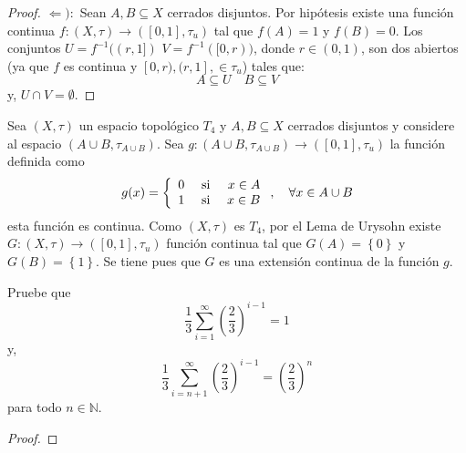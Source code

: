 \documentclass[12pt]{report}
\theoremstyle{largebreak}
\newcommand\cf[3]{\ensuremath{#1:#2\rightarrow#3}}
\begin{document}
\begin{proof}
        $\Leftarrow):$ Sean $A,B\subseteq X$ cerrados disjuntos. Por hipótesis existe una función continua $\cf{f}{(X,\tau)}{([0,1],\tau_u)}$ tal que $f(A)=1$ y $f(B)=0$. Los conjuntos $U=f^{-1}((r,1])$ $V=f^{-1}([0,r))$, donde $r\in(0,1)$, son dos abiertos (ya que $f$ es continua y $[0,r),(r,1],\in\tau_u$) tales que:
        \begin{equation*}
            A\subseteq U\quad B\subseteq V
        \end{equation*}
        y, $U\cap V=\emptyset$.
    \end{proof}

    \begin{exa}
        Sea $(X,\tau)$ un espacio topológico $T_4$ y $A,B\subseteq X$ cerrados disjuntos y considere al espacio $(A\cup B,\tau_{A\cup B})$. Sea $\cf{g}{(A\cup B,\tau_{A\cup B})}{([0,1],\tau_u)}$ la función definida como
        \begin{equation*}
            g(x)=\left\{ 
                \begin{array}{lcr}
                    0 &\textup{ si } & x\in A\\
                    1 &\textup{ si } & x\in B\\
                \end{array}
            \right.,\quad\forall x\in A\cup B
        \end{equation*}
        esta función es continua. Como $(X,\tau)$ es $T_4$, por el Lema de Urysohn existe $\cf{G}{(X,\tau)}{([0,1],\tau_u)}$ función continua tal que $G(A)=\left\{0 \right\}$ y $G(B)=\left\{1 \right\}$. Se tiene pues que $G$ es una extensión continua de la función $g$.
    \end{exa}

    \begin{excer}
        Pruebe que
        \begin{equation*}
            \frac{1}{3}\sum_{ i=1}^\infty\left(\frac{2}{3}\right)^{ i-1}=1
        \end{equation*}
        y,
        \begin{equation*}
            \frac{1}{3}\sum_{ i=n+1}^\infty\left(\frac{2}{3}\right)^{ i-1}=\left(\frac{2}{3}\right)^n
        \end{equation*}
        para todo $n\in\mathbb{N}$.
    \end{excer}

    \begin{proof}
        
    \end{proof}
\end{document}
